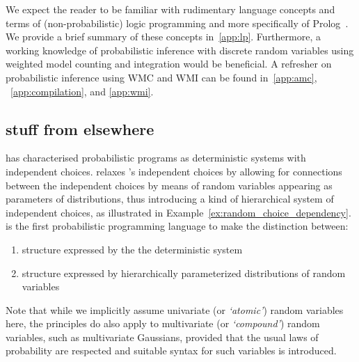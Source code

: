 We expect the reader to be familiar with rudimentary language concepts and terms of (non-probabilistic) logic programming and more specifically of Prolog~\citep{lloyd2012foundations,flach1994simply}. We provide a brief summary of these concepts in~\ref{app:lp}. Furthermore, a working knowledge of probabilistic inference with discrete random variables using weighted model counting and integration would be beneficial. A refresher on probabilistic inference using WMC and WMI can be found in~\ref{app:amc}, ~\ref{app:compilation}, and \ref{app:wmi}.



\subsection{stuff from elsewhere}

\citet{poole2010probabilistic} has characterised probabilistic programs as deterministic systems with  independent choices. \dcproblogsty relaxes \citeauthor{poole2010probabilistic}'s independent choices by allowing for connections between the independent choices by means of random variables appearing as parameters of distributions, thus introducing a kind of hierarchical system of independent choices, as illustrated in  Example~\ref{ex:random_choice_dependency}.
\dcproblogsty is the first probabilistic programming language to make the distinction between:
\begin{enumerate}
    \item structure expressed by the the deterministic system
    \item structure expressed by hierarchically parameterized distributions of random variables
\end{enumerate}

Note that while we implicitly assume   univariate (or {\em `atomic'}) random variables here, the principles do also apply to multivariate (or {\em `compound'}) random variables, such as multivariate Gaussians, provided that the usual laws of probability are respected and suitable syntax for such variables is introduced.


